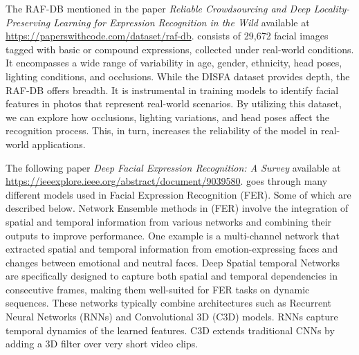 \documentclass{article} %
\begin{document}
The RAF-DB mentioned in the paper 
\textit{Reliable Crowdsourcing and Deep Locality-Preserving Learning for Expression Recognition in the Wild} \cite{ShanLi} available at
\url{https://paperswithcode.com/dataset/raf-db}. 
consists of 29,672 facial images tagged with basic or compound expressions, collected under real-world conditions. It encompasses a wide range of variability in age, gender, ethnicity, head poses, lighting conditions, and occlusions. While the DISFA dataset provides depth, the RAF-DB offers breadth. It is instrumental in training models to identify facial features in photos that represent real-world scenarios. By utilizing this dataset, we can explore how occlusions, lighting variations, and head poses affect the recognition process. This, in turn, increases the reliability of the model in real-world applications.

The following paper
\textit{Deep Facial Expression Recognition: A Survey} \cite{ShanLiIEEE} available at
\url{https://ieeexplore.ieee.org/abstract/document/9039580}. 
goes through many different models used in Facial Expression Recognition (FER). Some of which are described below. Network Ensemble methods in (FER) involve the integration of spatial and temporal information from various networks and combining their outputs to improve performance. One example is a multi-channel network that extracted spatial and temporal information from emotion-expressing faces and changes between emotional and neutral faces. Deep Spatial temporal Networks are specifically designed to capture both spatial and temporal dependencies in consecutive frames, making them well-suited for FER tasks on dynamic sequences. These networks typically combine architectures such as Recurrent Neural Networks (RNNs) and Convolutional 3D (C3D) models. RNNs capture temporal dynamics of the learned features. C3D extends traditional CNNs by adding a 3D filter over very short video clips. 
\end{document}
